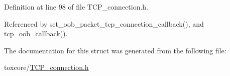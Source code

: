 Definition at line 98 of file T\+C\+P\+\_\+connection.\+h.



Referenced by set\+\_\+oob\+\_\+packet\+\_\+tcp\+\_\+connection\+\_\+callback(), and tcp\+\_\+oob\+\_\+callback().



The documentation for this struct was generated from the following file\+:\begin{DoxyCompactItemize}
\item 
toxcore/\hyperlink{_t_c_p__connection_8h}{T\+C\+P\+\_\+connection.\+h}\end{DoxyCompactItemize}
